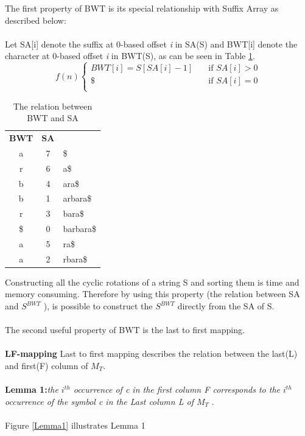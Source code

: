 \documentclass[11pt,a4paper]{report}
\begin{document}
The first property of BWT is its special relationship with Suffix 
Array as described below: \\\\
Let SA[i] denote the suffix at 0-based offset \emph{i} in SA(S)
and BWT[i] denote the character at 0-based offset \emph{i} in 
BWT(S), as can be seen in Table \ref{BWT&SA}\cite{bwt}.\\


\[ f(n)
\begin{cases}
    BWT[i]=S[SA[i]-1]   & \quad \text{if } SA[i] > 0\\
    \$  & \quad \text{if } SA[i]= 0\\
\end{cases}
\]


\begin{table}[h]
\centering
  \begin{tabular}{ c c l}
  \textbf{  BWT} & \textbf{SA } & \\ 
       a 	&	 7	 &   \$\\  
       r 	&	 6	 &	 a\$ \\
       b 	&	 4	 &	 ara\$ \\
       b 	&	 1	 &	 arbara\$ \\
       r  	&	 3	 &	 bara\$ \\
      \$ 	&	 0	 &	 barbara\$ \\
       a 	&	 5	 &	 ra\$ \\
       a 	&	 2	 &	 rbara\$ \\

  \end{tabular}
  
\caption{The relation between BWT and SA}
\label{BWT&SA}
\end{table}

Constructing all the cyclic rotations of a string S and sorting 
them is time and memory consuming. 
Therefore by using this property (the relation between SA and 
$S^{BWT}$ ), is possible to construct the $S^{BWT}$ directly 
from the SA of S.
\\\\
The second useful property of BWT is the last to first mapping.\\\\
\textbf{LF-mapping}  Last to first mapping describes the relation 
between the last(L) and first(F) column of $M_{T}$\cite{bwt}.\\\\
\textbf{Lemma 1:}\emph{the $i^{th}$ occurrence of c in the first 
column \emph{F} corresponds to the $i^{th}$ occurrence of the symbol 
c in the Last column \emph{L} of $M_{T}$} \cite{bwt}.\\\\
Figure \ref{Lemma1} illustrates Lemma 1\\
\end{document}
